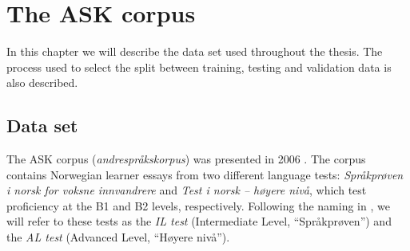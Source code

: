 \chapter{The ASK corpus}

In this chapter we will describe the data set used throughout the thesis. The
process used to select the split between training, testing and validation
data is also described.


\section{Data set}

The ASK corpus (\emph{andrespråkskorpus}) was presented in 2006
\autocite{tenfjord06}. The corpus contains Norwegian learner essays from two
different language tests: \emph{Språkprøven i norsk for voksne innvandrere}
and \emph{Test i norsk – høyere nivå}, which test proficiency at the B1 and
B2 levels, respectively. Following the naming in
\textcite{carlsen2012proficiency}, we will refer to these tests as the
\emph{IL test} (Intermediate Level, ``Språkprøven'') and the \emph{AL test}
(Advanced Level, ``Høyere nivå'').

